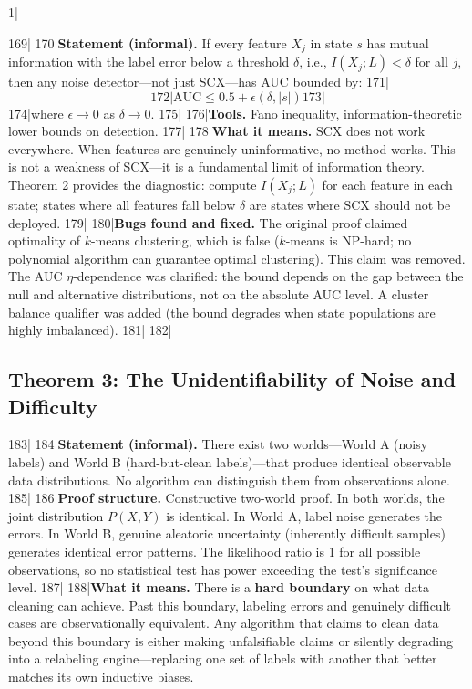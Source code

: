 1|\documentclass[12pt,a4paper]{article}
\begin{document}
169|
170|\textbf{Statement (informal).} If every feature $X_j$ in state $s$ has mutual information with the label error below a threshold $\delta$, i.e., $I(X_j; L) < \delta$ for all $j$, then any noise detector—not just SCX—has AUC bounded by:
171|\[
172|\text{AUC} \leq 0.5 + \epsilon(\delta, |s|)
173|\]
174|where $\epsilon \to 0$ as $\delta \to 0$.
175|
176|\textbf{Tools.} Fano inequality, information-theoretic lower bounds on detection.
177|
178|\textbf{What it means.} SCX does not work everywhere. When features are genuinely uninformative, no method works. This is not a weakness of SCX—it is a fundamental limit of information theory. Theorem 2 provides the diagnostic: compute $I(X_j; L)$ for each feature in each state; states where all features fall below $\delta$ are states where SCX should not be deployed.
179|
180|\textbf{Bugs found and fixed.} The original proof claimed optimality of $k$-means clustering, which is false ($k$-means is NP-hard; no polynomial algorithm can guarantee optimal clustering). This claim was removed. The AUC $\eta$-dependence was clarified: the bound depends on the gap between the null and alternative distributions, not on the absolute AUC level. A cluster balance qualifier was added (the bound degrades when state populations are highly imbalanced).
181|
182|\subsection{Theorem 3: The Unidentifiability of Noise and Difficulty}
183|
184|\textbf{Statement (informal).} There exist two worlds—World A (noisy labels) and World B (hard-but-clean labels)—that produce identical observable data distributions. No algorithm can distinguish them from observations alone.
185|
186|\textbf{Proof structure.} Constructive two-world proof. In both worlds, the joint distribution $P(X, Y)$ is identical. In World A, label noise generates the errors. In World B, genuine aleatoric uncertainty (inherently difficult samples) generates identical error patterns. The likelihood ratio is 1 for all possible observations, so no statistical test has power exceeding the test's significance level.
187|
188|\textbf{What it means.} There is a \textbf{hard boundary} on what data cleaning can achieve. Past this boundary, labeling errors and genuinely difficult cases are observationally equivalent. Any algorithm that claims to clean data beyond this boundary is either making unfalsifiable claims or silently degrading into a relabeling engine—replacing one set of labels with another that better matches its own inductive biases.
\end{document}
